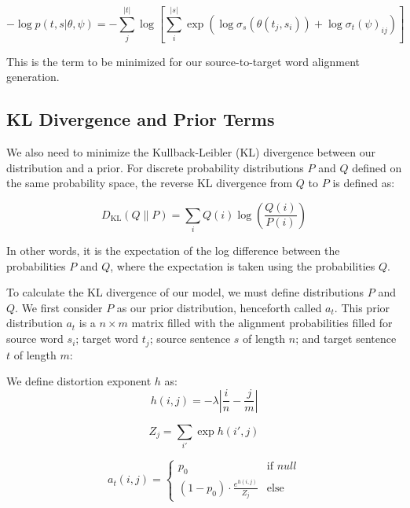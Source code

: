 \documentclass[twoside,twocolumn]{article}
\newlength\mystoreparindent
\newenvironment{myparindent}[1]{%
  \setlength{\mystoreparindent}{\the\parindent}
  \setlength{\parindent}{#1}
  }{%
  \setlength{\parindent}{\mystoreparindent}
}
\begin{document}
\begin{myparindent}{0pt}
\begin{equation}
  -\log  p(t , s | \theta, \psi) =
  - \sum_j^{|t|}  \log \left[ \sum_i^{|s|} \exp
      \left( \log \sigma_s(\theta(t_j, s_i)) + \log \sigma_t(\psi)_{ij} \right)
    \right]
\end{equation}

This is the term to be minimized for our source-to-target word alignment
generation.


\subsection{KL Divergence and Prior Terms}

We also need to minimize the Kullback-Leibler (KL) divergence between our
distribution and a prior. For discrete probability distributions $P$ and $Q$
defined on the same probability space, the reverse KL divergence from $Q$ to
$P$ is defined as:

\begin{equation}
D_{\mathrm{KL}}(Q \| P) = \sum_{i} Q(i) \log \left( \frac{Q(i)}{P(i)} \right)
\end{equation}

In other words, it is the expectation of the log difference between the
probabilities $P$ and $Q$, where the expectation is taken using the
probabilities $Q$.

To calculate the KL divergence of our model, we must define distributions $P$
and $Q$. We first consider $P$ as our prior distribution, henceforth called
$a_t$. This prior distribution $a_t$ is a $n \times m$ matrix filled with the
alignment probabilities filled for source word $s_i$; target word $t_j$; source
sentence $s$ of length $n$; and target sentence $t$ of length $m$:

We define distortion exponent $h$ as:
\begin{equation}
  h(i, j) = {-\lambda \left| \frac{i}{n} - \frac{j}{m}\right|}
\end{equation}

\begin{equation}
  Z_j = \sum_{i'} \exp h(i', j)
\end{equation}

\begin{equation}
a_t (i, j) =
\begin{cases}
      p_0 & \text{if } null \\
     (1-p_0) \cdot \frac{e^{h(i,j)}}{Z_j} & \text{else}
   \end{cases}
\end{equation}


\end{myparindent}
\end{document}
